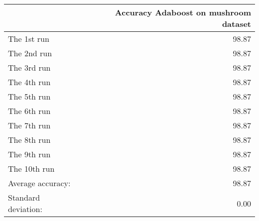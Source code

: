 \begin{tabular}{lr}
\toprule
{} &  Accuracy Adaboost on mushroom dataset \\
\midrule
The 1st run         &                                  98.87 \\
The 2nd run         &                                  98.87 \\
The 3rd run         &                                  98.87 \\
The 4th run         &                                  98.87 \\
The 5th run         &                                  98.87 \\
The 6th run         &                                  98.87 \\
The 7th run         &                                  98.87 \\
The 8th run         &                                  98.87 \\
The 9th run         &                                  98.87 \\
The 10th run        &                                  98.87 \\
Average accuracy:   &                                  98.87 \\
Standard deviation: &                                   0.00 \\
\bottomrule
\end{tabular}
